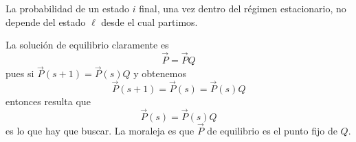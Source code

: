 \documentclass[10pt,oneside]{CBFT_book}
\begin{document}
La probabilidad de un estado $i$ final, una vez dentro del régimen estacionario, no depende del estado
$\ell$ desde el cual partimos.

La solución de equilibrio claramente es
\[
	\vec{P} = \vec{P} Q 
\]
pues si $\vec{P}(s+1) = \vec{P}(s)Q$ y obtenemos
\[
	\vec{P}(s+1) = \vec{P}(s) = \vec{P}(s)Q
\]
entonces resulta que 
\[
	\vec{P}(s)  = \vec{P}(s) Q
\]
es lo que hay que buscar.
La moraleja es que $\vec{P}$ de equilibrio es el punto fijo de $Q$.




\end{document}
